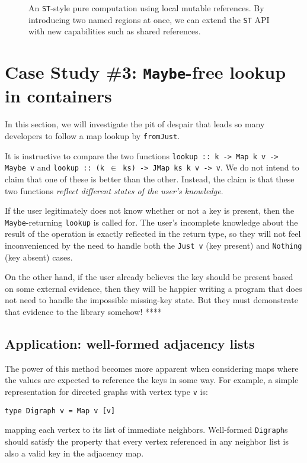 \documentclass[format=sigplan, review=false, screen=true]{acmart}
\begin{document}
\begin{figure}
  \inputminted{haskell}{st.hs}
  \caption{An \texttt{ST}-style pure computation using local mutable
    references. By introducing two named regions at once, we can extend
    the \texttt{ST} API with new capabilities such as shared references.\label{st-example}}
\end{figure}

\section{Case Study \#3: \texttt{Maybe}-free lookup in containers}

In this section, we will investigate the pit of despair that leads so
many developers to follow a map lookup by \texttt{fromJust}.

It is instructive to compare the two functions \texttt{lookup :: k -> Map k v -> Maybe v}
and \texttt{lookup :: (k $\in$ ks) -> JMap ks k v -> v}. We do not intend to claim that
one of these is better than the other. Instead, the claim is that these two functions
\emph{reflect different states of the user's knowledge}.

If the user legitimately does not know whether or not a key is present, then the
\texttt{Maybe}-returning \texttt{lookup} is called for. The user's incomplete knowledge
about the result of the operation is exactly reflected in the return type, so they will
not feel inconvenienced by the need to handle both the \texttt{Just v} (key present)
and \texttt{Nothing} (key absent) cases.

On the other hand, if the user already believes the key should be present based on some
external evidence, then they will be happier writing a program that does not need to handle
the impossible missing-key state. But they must demonstrate that evidence to the library
somehow!  ****

\subsection{Application: well-formed adjacency lists}

The power of this method becomes more apparent when considering maps where
the values are expected to reference the keys in some way. For example, a
simple representation for directed graphs with vertex type \texttt{v} is:
\begin{verbatim}
type Digraph v = Map v [v]
\end{verbatim}
mapping each vertex to its list of immediate neighbors. Well-formed \texttt{Digraph}s
should satisfy the property that every vertex referenced in any neighbor list is also
a valid key in the adjacency map.
\end{document}
